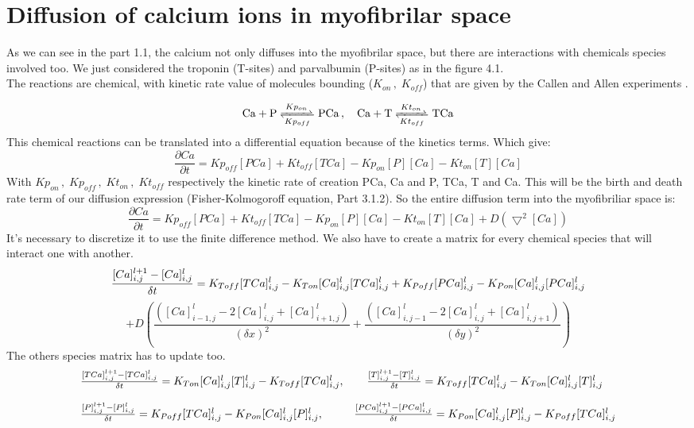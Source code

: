 \documentclass[a4paper,11pt]{report}
\begin{document}
\section*{Diffusion of calcium ions in myofibrilar space}
As we can see in the part 1.1, the calcium not only diffuses into the myofibrilar space, but there are interactions with chemicals species involved too. We just considered the troponin (T-sites) and parvalbumin (P-sites) as in the figure 4.1.\\
 The reactions are chemical, with kinetic rate value of molecules bounding ($K_{on} \, , \; K_{off}$) that are given by the Callen and Allen experiments \cite{Cannell1984}. 

$$
\begin{array}{l c}
\ce{Ca}  + \ce{P <=>[Kp_{on}][Kp_{off}]} \ce{PCa} \, ,& \, \ce{Ca}  + \ce{T <=>[Kt_{on}][Kt_{off}]} \ce{TCa}
\end{array} 
$$
This chemical reactions can be translated into a differential equation because of the kinetics terms.
Which give:
$$
\frac{\partial Ca}{\partial t} = Kp_{off}[PCa]+Kt_{off}[TCa]-Kp_{on}[P][Ca]-Kt_{on}[T][Ca]
$$
With $Kp_{on}\, , \; Kp_{off}\, , \; Kt_{on} \, , \; Kt_{off} $ respectively the kinetic rate of creation PCa, Ca and P, TCa, T and Ca. 
This will be the birth and death rate term of our diffusion expression (Fisher-Kolmogoroff equation, Part 3.1.2). 
 So the entire diffusion term into the myofibriliar space is:
$$
\frac{\partial Ca}{\partial t} = Kp_{off}[PCa]+Kt_{off}[TCa]-Kp_{on}[P][Ca]-Kt_{on}[T][Ca]+D(\bigtriangledown ^{2}[Ca])
$$
It's necessary to discretize it to use the finite difference method. We also have to create a matrix for every chemical species that will interact one with another. 
$$
\frac {[Ca]_{i,j}^{l+1} - [Ca]_{i,j}^{l}}{\delta t}= K_{Toff}[TCa]_{i,j}^{l}-K_{Ton}[Ca]_{i,j}^{l}[TCa]_{i,j}^{l}+K_{Poff}[PCa]_{i,j}^{l}-K_{Pon}[Ca]_{i,j}^{l}[PCa]_{i,j}^{l} \\
$$
$$
 + D(\frac {([Ca]_{i-1,j}^{l}-2[Ca]_{i,j}^{l}+[Ca]_{i+1,j}^{l})}{(\delta x)^{2}}+ \frac {([Ca]_{i,j-1}^{l}-2[Ca]_{i,j}^{l}+[Ca]_{i,j+1}^{l})}{(\delta y)^{2}}) 
$$
The others species matrix has to update too.
$$
\begin{array}{l c}
\frac {[TCa]_{i,j}^{l+1} - [TCa]_{i,j}^{l}}{\delta t}= K_{Ton}[Ca]_{i,j}^{l}[T]_{i,j}^{l}-K_{Toff}[TCa]_{i,j}^{l}, &\frac {[T]_{i,j}^{l+1} - [T]_{i,j}^{l}}{\delta t}= K_{Toff}[TCa]_{i,j}^{l}- K_{Ton}[Ca]_{i,j}^{l}[T]_{i,j}^{l} \\
\\
\frac {[P]_{i,j}^{l+1} - [P]_{i,j}^{l}}{\delta t}= K_{Poff}[TCa]_{i,j}^{l} - K_{Pon}[Ca]_{i,j}^{l}[P]_{i,j}^{l}, &  \frac {[PCa]_{i,j}^{l+1} - [PCa]_{i,j}^{l}}{\delta t}= K_{Pon}[Ca]_{i,j}^{l}[P]_{i,j}^{l}-K_{Poff}[TCa]_{i,j}^{l}
\end{array}
$$
\end{document}
